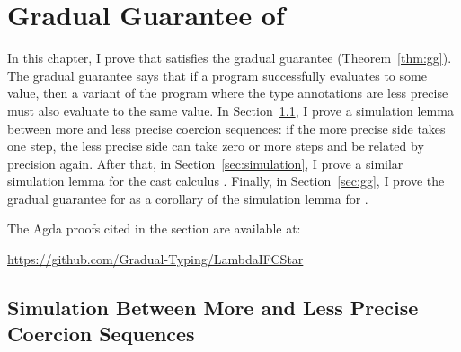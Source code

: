 \chapter{Gradual Guarantee of \Surface}
\label{ch:gg}


In this chapter, I prove that \Surface satisfies the gradual guarantee
(Theorem~\ref{thm:gg}). The gradual guarantee says that if a \Surface program
successfully evaluates to some value, then a variant of the program where the
type annotations are less precise must also evaluate to the same value. In
Section~\ref{sec:sim-cexpr}, I prove a simulation lemma between more and less
precise coercion sequences: if the more precise side takes one step, the less
precise side can take zero or more steps and be related by precision again.
After that, in Section~\ref{sec:simulation}, I prove a similar simulation lemma
for the cast calculus \CC. Finally, in Section~\ref{sec:gg}, I prove the gradual
guarantee for \Surface as a corollary of the simulation lemma for \CC.

The Agda proofs cited in the section are available at:
\begin{center}
  \url{https://github.com/Gradual-Typing/LambdaIFCStar}
\end{center}


\section{Simulation Between More and Less Precise Coercion Sequences}
\label{sec:sim-cexpr}

